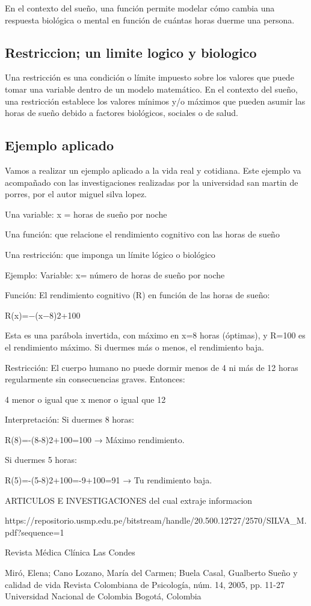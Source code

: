 \documentclass{article}
\begin{document}
En el contexto del sueño, una función permite modelar cómo cambia una respuesta biológica o mental en función de cuántas horas duerme una persona.

\subsection{Restriccion; un limite logico y biologico }

Una restricción es una condición o límite impuesto sobre los valores que puede tomar una variable dentro de un modelo matemático. En el contexto del sueño, una restricción establece los valores mínimos y/o máximos que pueden asumir las horas de sueño debido a factores biológicos, sociales o de salud.

\subsection{Ejemplo aplicado}

Vamos a realizar un ejemplo aplicado a la vida real y cotidiana. Este ejemplo va acompañado con las investigaciones realizadas por la universidad san martin de porres, por el autor miguel silva lopez.

Una variable: 
x = horas de sueño por noche

Una función:
que relacione el rendimiento cognitivo con las horas de sueño

Una restricción:
que imponga un límite lógico o biológico

Ejemplo:
Variable:
x= número de horas de sueño por noche

Función:
El rendimiento cognitivo (R) en función de las horas de sueño:

R(x)=−(x−8)2+100

Esta es una parábola invertida, con máximo en x=8 horas (óptimas), y 
R=100 es el rendimiento máximo. Si duermes más o menos, el rendimiento baja.

Restricción:
El cuerpo humano no puede dormir menos de 4 ni más de 12 horas regularmente sin consecuencias graves. Entonces:

4 menor o igual que x menor o igual que 12

Interpretación:
Si duermes 8 horas:

R(8)=-(8-8)2+100=100
→ Máximo rendimiento.

Si duermes 5 horas:

R(5)=-(5-8)2+100=-9+100=91
→ Tu rendimiento baja. 





ARTICULOS E INVESTIGACIONES del cual extraje informacion

https://repositorio.usmp.edu.pe/bitstream/handle/20.500.12727/2570/SILVA_M.pdf?sequence=1

Revista Médica Clínica Las Condes

Miró, Elena; Cano Lozano, María del Carmen; Buela Casal, Gualberto
Sueño y calidad de vida
Revista Colombiana de Psicología, núm. 14, 2005, pp. 11-27
Universidad Nacional de Colombia
Bogotá, Colombia
\end{document}
